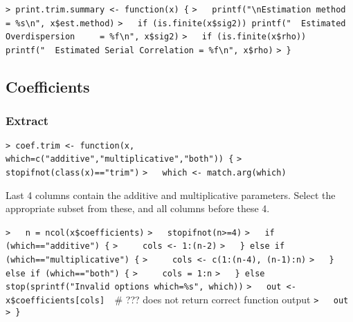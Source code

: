 \documentclass[a4paper]{article}
\begin{document}
\verb~> print.trim.summary <- function(x) {~\newline
\verb~>   printf("\nEstimation method = %s\n", x$est.method)~\newline
\verb~>   if (is.finite(x$sig2)) printf("  Estimated Overdispersion     = %f\n", x$sig2)~\newline
\verb~>   if (is.finite(x$rho))  printf("  Estimated Serial Correlation = %f\n", x$rho)~\newline
\verb~> }~\par




\subsection{Coefficients}\par



\subsubsection{Extract}\par

\verb~> coef.trim <- function(x, which=c("additive","multiplicative","both")) {~\newline
\verb~>   stopifnot(class(x)=="trim")~\newline
\verb~>   which <- match.arg(which)~\par
Last 4 columns contain the additive and multiplicative parameters.
Select the appropriate subset from these, and all columns before these 4.\par
\verb~>   n = ncol(x$coefficients)~\newline
\verb~>   stopifnot(n>=4)~\newline
\verb~>   if (which=="additive") {~\newline
\verb~>     cols <- 1:(n-2)~\newline
\verb~>   } else if (which=="multiplicative") {~\newline
\verb~>     cols <- c(1:(n-4), (n-1):n)~\newline
\verb~>   } else if (which=="both") {~\newline
\verb~>     cols = 1:n~\newline
\verb~>   } else stop(sprintf("Invalid options which=%s", which))~\newline
\verb~>   out <- x$coefficients[cols]  ~{\sffamily\# ??? does not return correct function output}\newline
\verb~>   out~\newline
\verb~> }~\par
\end{document}
